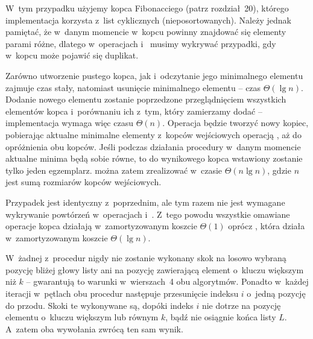 \subproblem %
W~tym przypadku użyjemy kopca Fibonacciego (patrz rozdział~20), którego implementacja korzysta z~list cyklicznych (nieposortowanych). Należy jednak pamiętać, że w~danym momencie w~kopcu powinny znajdować się elementy parami różne, dlatego w~operacjach  i~ musimy wykrywać przypadki, gdy w~kopcu może pojawić się duplikat.

Zarówno utworzenie pustego kopca, jak i~odczytanie jego minimalnego elementu zajmuje czas stały, natomiast usunięcie minimalnego elementu -- czas $\Theta(\lg n)$. Dodanie nowego elementu zostanie poprzedzone przeglądnięciem wszystkich elementów kopca i~porównaniu ich z~tym, który zamierzamy dodać -- implementacja  wymaga więc czasu $\Theta(n)$. Operacja  będzie tworzyć nowy kopiec, pobierając aktualne minimalne elementy z~kopców wejściowych operacją , aż do opróżnienia obu kopców. Jeśli podczas działania procedury w~danym momencie aktualne minima będą sobie równe, to do wynikowego kopca wstawiony zostanie tylko jeden egzemplarz.  można zatem zrealizować w~czasie $\Theta(n\lg n)$, gdzie $n$ jest sumą rozmiarów kopców wejściowych.

\subproblem %
Przypadek jest identyczny z~poprzednim, ale tym razem nie jest wymagane wykrywanie powtórzeń w~operacjach  i~. Z~tego powodu wszystkie omawiane operacje kopca działają w~zamortyzowanym koszcie $\Theta(1)$ oprócz , która działa w~zamortyzowanym koszcie $\Theta(\lg n)$.


\subproblem %
W~żadnej z~procedur nigdy nie zostanie wykonany skok na losowo wybraną pozycję bliżej głowy listy ani na pozycję zawierającą element o~kluczu większym niż $k$ -- gwarantują to warunki w~wierszach~4 obu algorytmów. Ponadto w~każdej iteracji w~pętlach  obu procedur następuje przesunięcie indeksu $i$ o~jedną pozycję do przodu. Skoki te wykonywane są, dopóki indeks $i$ nie dotrze na pozycję elementu o~kluczu większym lub równym $k$, bądź nie osiągnie końca listy $L$. A~zatem oba wywołania zwrócą ten sam wynik.

